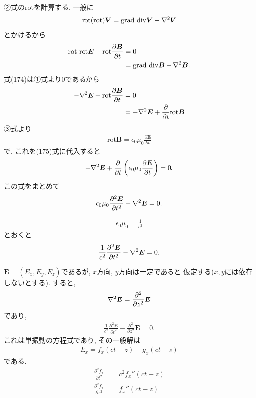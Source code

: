 \documentclass[a4paper,12pt]{jlreq}
\begin{document}
②式のrotを計算する. 一般に
\begin{align}
  \text{rot}(\text{rot}) \bm{V} = \text{grad div}\bm{V} - \laplacian{\bm{V}}
\end{align}
とかけるから
\begin{align}
  \text{rot rot}\bm{E} + \text{rot}\frac{\partial \bm{B}}{\partial t} &= 0\\
  &= \text{grad div}\bm{B} - \laplacian{\bm{B}}.
\end{align}
式(174)は①式より0であるから
\begin{align}
  -\laplacian{\bm{E}} + \text{rot}\frac{\partial \bm{B}}{\partial t} &= 0\\
  &= -\laplacian{\bm{E}} + \frac{\partial}{\partial t} \text{rot}\bm{B}
\end{align} 
③式より
\begin{align}
  \text{rot} \bm{B} = \epsilon_0 \mu_0 \frac{\partial \bm{E}}{\partial t}
\end{align}
で, これを(175)式に代入すると
\begin{align}
  -\laplacian{\bm{E}} + \frac{\partial}{\partial t} \left(\epsilon_0 \mu_0 \frac{\partial\bm{E}}{\partial t}\right) =0.
\end{align}
この式をまとめて
\begin{align}
  \epsilon_0 \mu_0 \frac{\partial^2 \bm{E}}{\partial t^2} - \laplacian{\bm{E}} = 0.
\end{align}

\begin{align}
  \epsilon_0 \mu_0 = \frac{1}{c^2}
\end{align}
とおくと
\begin{align}
  \frac{1}{c^2} \frac{\partial^2 \bm{E}}{\partial t^2} - \laplacian{\bm{E}} = 0.
\end{align}
\par

$\bm{E} = (E_x, E_y, E_z)$であるが, $x$方向, $y$方向は一定であると
仮定する($x,y$には依存しないとする). すると, 
\begin{align}
  \laplacian{\bm{E}} = \frac{\partial^2}{\partial z^2} \bm{E}
\end{align}
であり, 
\begin{align}
  \frac{1}{c^2} \frac{\partial^2 \bm{E}}{\partial t^2} - \frac{\partial^2}{\partial z^2}{\bm{E}} = 0.
\end{align}
これは単振動の方程式であり, その一般解は
\begin{align}
  E_x = f_x(ct - z) + g_x(ct + z)
\end{align}
である. 
\begin{align}
  \frac{\partial^2 f_x}{\partial t^2} &= c^2 f_x''(ct - z)\\
  \frac{\partial^2 f_x}{\partial z^2} &= f_x''(ct - z)
\end{align}
\end{document}
